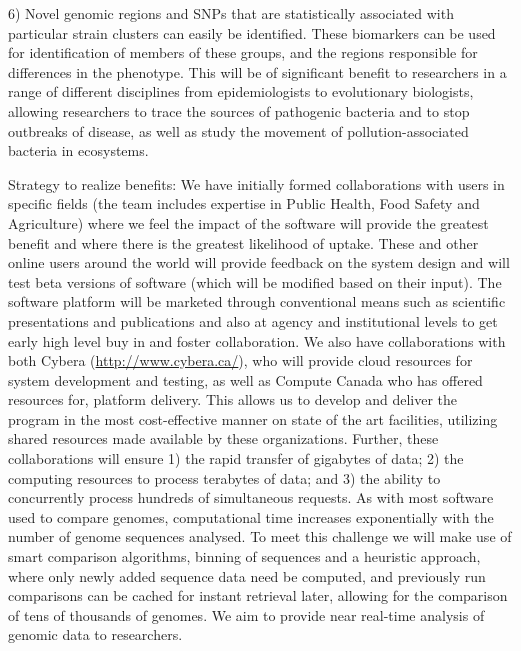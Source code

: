 \documentclass[letterpaper,12pt]{report}
\begin{document}
6) Novel genomic regions and SNPs that are statistically associated with particular strain clusters can easily be identified. These biomarkers can be used for identification of members of these groups, and the regions responsible for differences in the phenotype. This will be of significant benefit to researchers in a range of different disciplines from epidemiologists to evolutionary biologists, allowing researchers to trace the sources of pathogenic bacteria and to stop outbreaks of disease, as well as study the movement of pollution-associated bacteria in ecosystems.

Strategy to realize benefits: We have initially formed collaborations with users in specific fields (the team includes expertise in Public Health, Food Safety and Agriculture) where we feel the impact of the software will provide the greatest benefit and where there is the greatest likelihood of uptake.  These and other online users around the world will provide feedback on the system design and will test beta versions of software (which will be modified based on their input). The software platform will be marketed through conventional means such as scientific presentations and publications and also at agency and institutional levels to get early high level buy in and foster collaboration. We also have collaborations with both Cybera (\url{http://www.cybera.ca/}), who will provide cloud resources for system development and testing, as well as Compute Canada who has offered resources for, platform delivery. This allows us to develop and deliver the program in the most cost-effective manner on state of the art facilities, utilizing shared resources made available by these organizations. Further, these collaborations will ensure 1) the rapid transfer of gigabytes of data; 2) the computing resources to process terabytes of data; and 3) the ability to concurrently process hundreds of simultaneous requests. As with most software used to compare genomes, computational time increases exponentially with the number of genome sequences analysed. To meet this challenge we will make use of smart comparison algorithms, binning of sequences and a heuristic approach, where only newly added sequence data need be computed, and previously run comparisons can be cached for instant retrieval later, allowing for the comparison of tens of thousands of genomes. We aim to provide near real-time analysis of genomic data to researchers.

 


\end{document}
